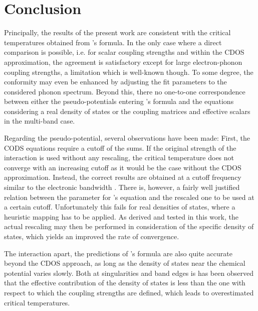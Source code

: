 
\chapter{Conclusion}
\label{conclusion}

Principally, the results of the present work are consistent with the critical
temperatures obtained from 's formula. In the only case where a
direct comparison is possible, i.e. for scalar coupling strengths and within the
CDOS approximation, the agreement is satisfactory except for large
electron-phonon coupling strengths, a limitation which is well-known though. To
some degree, the conformity may even be enhanced by adjusting the fit parameters
to the considered phonon spectrum. Beyond this, there no one-to-one
correspondence between either the  pseudo-potentials entering
's formula and the  equations considering a real
density of states or the coupling matrices and effective scalars in the
multi-band case.

Regarding the  pseudo-potential, several observations have been
made: First, the CODS  equations require a cutoff of the
 sums. If the original strength of the 
interaction is used without any rescaling, the critical temperature does not
converge with an increasing cutoff as it would be the case without the CDOS
approximation. Instead, the correct results are obtained at a cutoff frequency
similar to the electronic bandwidth \cites{AllenDynes75}{AllenMitrovic82}. There
is, however, a fairly well justified relation between the parameter for
's equation and the rescaled one to be used at a certain cutoff.
Unfortunately this fails for real densities of states, where a heuristic mapping
has to be applied. As derived and tested in this work, the actual rescaling may
then be performed in consideration of the specific density of states, which
yields an improved the rate of convergence.

The  interaction apart, the predictions of 's
formula are also quite accurate beyond the CDOS approach, as long as the density
of states near the chemical potential varies slowly. Both at 
singularities and band edges is has been observed that the effective
contribution of the density of states is less than the one with respect to which
the coupling strengths are defined, which leads to overestimated critical
temperatures.

